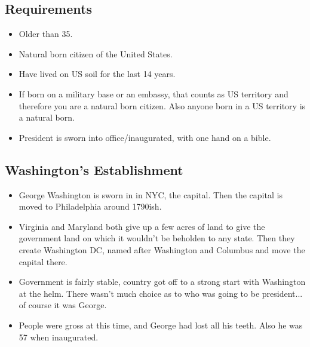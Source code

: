 \documentclass{article}
\begin{document}
  \subsection{Requirements}
    \begin{itemize}
      \item Older than 35.
      \item Natural born citizen of the United States.
      \item Have lived on US soil for the last 14 years.
      \item If born on a military base or an embassy, that counts as US territory and therefore you are a natural born citizen. Also anyone born in a US territory is a natural born. 
      \item President is sworn into office/inaugurated, with one hand on a bible.
    \end{itemize}
  \subsection{Washington's Establishment}
    \begin{itemize}
      \item George Washington is sworn in in NYC, the capital. Then the capital is moved to Philadelphia around 1790ish. 
      \item Virginia and Maryland both give up a few acres of land to give the government land on which it wouldn't be beholden to any state. Then they create Washington DC, named after Washington and Columbus and move the capital there.
      \item Government is fairly stable, country got off to a strong start with Washington at the helm. There wasn't much choice as to who was going to be president... of course it was George. 
      \item People were gross at this time, and George had lost all his teeth. Also he was 57 when inaugurated.
    \end{itemize}
\end{document}
